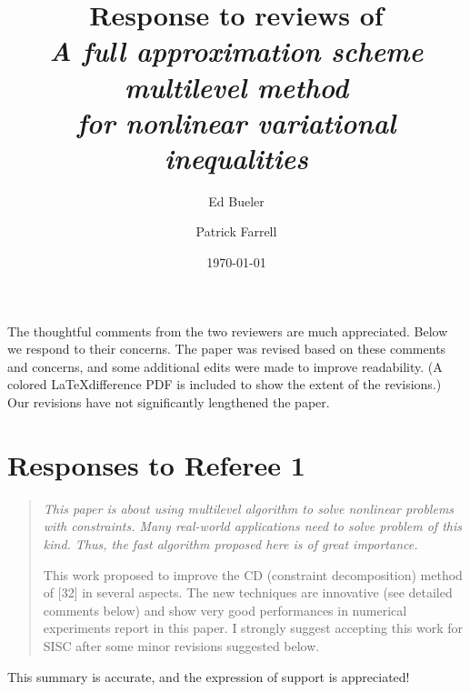 \documentclass[letterpaper,final,12pt,reqno]{amsart}
\newenvironment{review}%
{\bigskip \par \begin{quote} \selectfont \sl}%
{\end{quote}}
\newcommand\short[1]{\medskip\noindent #1}   %
\begin{document}
\title[Response to reviews]{Response to reviews of \\ \emph{A full approximation scheme multilevel method \\ for nonlinear variational inequalities}}

\author{Ed Bueler}

\author{Patrick Farrell}

\date{\today}

\maketitle


\thispagestyle{empty}

The thoughtful comments from the two reviewers are much appreciated.  Below we respond to their concerns.  The paper was revised based on these comments and concerns, and some additional edits were made to improve readability.  (A colored \LaTeX difference PDF is included to show the extent of the revisions.)  Our revisions have not significantly lengthened the paper.


\section{Responses to Referee 1}


\begin{review}
This paper is about using multilevel algorithm to solve nonlinear problems with constraints. Many real-world applications need to solve problem of this kind. Thus, the fast algorithm proposed here is of great importance.

This work proposed to improve the CD (constraint decomposition) method of [32] in several aspects. The new techniques are innovative (see detailed comments below) and show very good performances in numerical experiments report in this paper. I strongly suggest accepting this work for SISC after some minor revisions suggested below.
\end{review}

\short{This summary is accurate, and the expression of support is appreciated!}
\end{document}
